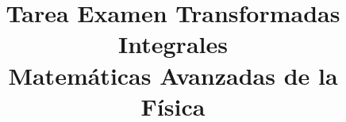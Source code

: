 
\usepackage{standalone}
\usepackage{tikz}   
\usepackage{tikz-3dplot}
\usetikzlibrary{decorations.pathmorphing,patterns}
\usepackage{enumerate}
\usepackage{pifont}
\renewcommand{\labelitemi}{\ding{43}}
\title{{Tarea Examen Transformadas Integrales} \\ {\large Matemáticas Avanzadas de la Física}}
\date{ }

\vspace{-4cm}
\renewcommand\labelenumii{\theenumi.{\arabic{enumii}})}
\maketitle
\fontsize{14}{14}\selectfont
